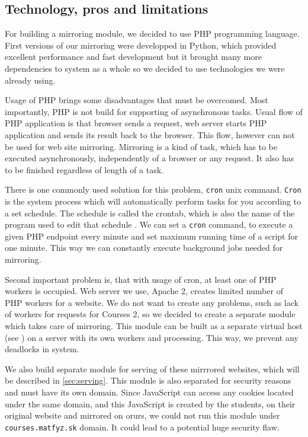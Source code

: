 \subsection{Technology, pros and limitations}
\label{sec:technology}
For building a mirroring module, we decided to use PHP programming language. First versions of our mirroring were developped in Python, which provided excellent performance and fast development but it brought many more dependencies to system as a whole so we decided to use technologies we were already using. 

Usage of PHP brings some disadvantages that must be overcomed. Most importantly, PHP is not build for supporting of asynchronous tasks. Usual flow of PHP application is that browser sends a request, web server starts PHP application and sends its result back to the browser. This flow, however can not be used for web site mirroring. Mirroring is a kind of task, which has to be executed asynchronously, independently of a browser or any request. It also has to be finished regardless of length of a task.

There is one commonly used solution for this problem, \texttt{cron} unix command. \texttt{Cron} is the system process which will automatically perform tasks for you according to a set schedule. The schedule is called the crontab, which is also the name of the program used to edit that schedule \cite{crontab}. We can set a \texttt{cron} command, to execute a given PHP endpoint every minute and set maximum running time of a script for one minute. This way we can constantly execute background jobs needed for mirroring.

Second important problem is, that with usage of cron, at least one of PHP workers is occupied. Web server we use, Apache 2, creates limited number of PHP workers for a website. We do not want to create any problems, such as lack of workers for requests for Courses 2, so we decided to create a separate module which takes care of mirroring. This module can be built as a separate virtual host (see \cite{apachepocket}) on a server with its own workers and processing. This way, we prevent any deadlocks in system.

We also build separate module for serving of these mirrrored websites, which will be described in \ref{sec:serving}. This module is also separated for security reasons and must have its own domain. Since JavaScript can access any cookies located under the same domain, and this JavaScript is created by the students, on their original website and mirrored on orurs, we could not run this module under \texttt{courses.matfyz.sk} domain. It could lead to a potential huge security flaw.
 


